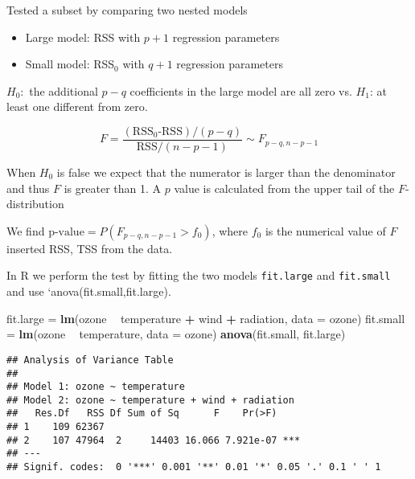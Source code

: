 \documentclass[ignorenonframetext,]{beamer}
\newenvironment{Shaded}{\begin{snugshade}}{\end{snugshade}}
\newcommand{\KeywordTok}[1]{\textcolor[rgb]{0.13,0.29,0.53}{\textbf{#1}}}
\newcommand{\DataTypeTok}[1]{\textcolor[rgb]{0.13,0.29,0.53}{#1}}
\newcommand{\StringTok}[1]{\textcolor[rgb]{0.31,0.60,0.02}{#1}}
\newcommand{\OperatorTok}[1]{\textcolor[rgb]{0.81,0.36,0.00}{\textbf{#1}}}
\newcommand{\NormalTok}[1]{#1}
\providecommand{\tightlist}{%
  \setlength{\itemsep}{0pt}\setlength{\parskip}{0pt}}
\begin{document}
\begin{frame}[fragile]

\begin{block}{Tested a subset by comparing two nested models}

\begin{itemize}
\tightlist
\item
  Large model: RSS with \(p+1\) regression parameters
\item
  Small model: RSS\(_0\) with \(q+1\) regression parameters
\end{itemize}

\(H_0:\) the additional \(p-q\) coefficients in the large model are all
zero vs. \(H_1\): at least one different from zero.

\[F=\frac{(\text{RSS$_0$-RSS})/(p-q)}{\text{RSS}/(n-p-1)} \sim F_{p-q,n-p-1}\]

When \(H_0\) is false we expect that the numerator is larger than the
denominator and thus \(F\) is greater than 1. A \(p\) value is
calculated from the upper tail of the \(F\)-distribution

We find \(\text{p-value}=P(F_{p-q,n-p-1}>f_0)\), where \(f_0\) is the
numerical value of \(F\) inserted RSS, TSS from the data.

In R we perform the test by fitting the two models \texttt{fit.large}
and \texttt{fit.small} and use `anova(fit.small,fit.large).

\end{block}

\end{frame}

\begin{frame}[fragile]

\footnotesize

\begin{Shaded}
\begin{Highlighting}[]
\NormalTok{fit.large =}\StringTok{ }\KeywordTok{lm}\NormalTok{(ozone }\OperatorTok{~}\StringTok{ }\NormalTok{temperature }\OperatorTok{+}\StringTok{ }\NormalTok{wind }\OperatorTok{+}\StringTok{ }\NormalTok{radiation, }\DataTypeTok{data =}\NormalTok{ ozone)}
\NormalTok{fit.small =}\StringTok{ }\KeywordTok{lm}\NormalTok{(ozone }\OperatorTok{~}\StringTok{ }\NormalTok{temperature, }\DataTypeTok{data =}\NormalTok{ ozone)}
\KeywordTok{anova}\NormalTok{(fit.small, fit.large)}
\end{Highlighting}
\end{Shaded}

\begin{verbatim}
## Analysis of Variance Table
## 
## Model 1: ozone ~ temperature
## Model 2: ozone ~ temperature + wind + radiation
##   Res.Df   RSS Df Sum of Sq      F    Pr(>F)    
## 1    109 62367                                  
## 2    107 47964  2     14403 16.066 7.921e-07 ***
## ---
## Signif. codes:  0 '***' 0.001 '**' 0.01 '*' 0.05 '.' 0.1 ' ' 1
\end{verbatim}

\normalsize

\end{frame}
\end{document}
